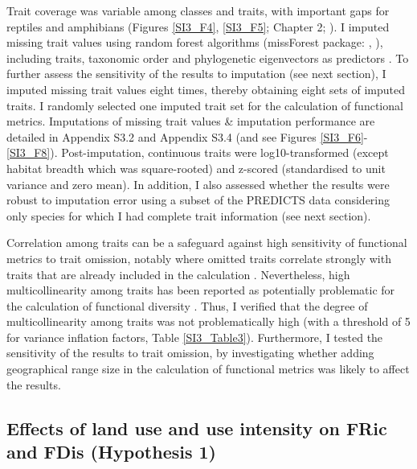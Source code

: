 Trait coverage was variable among classes and traits, with important gaps for reptiles and amphibians (Figures \ref{SI3_F4}, \ref{SI3_F5}; Chapter 2; \citet{Etard2020}). I imputed missing trait values using random forest algorithms (missForest package: \citet{Stekhoven2012}, \citet{Stekhoven2016}), including traits, taxonomic order and phylogenetic eigenvectors as predictors \citep{Debastiani2021, Penone2014}. To further assess the sensitivity of the results to imputation (see next section), I imputed missing trait values eight times, thereby obtaining eight sets of imputed traits. I randomly selected one imputed trait set for the calculation of functional metrics. Imputations of missing trait values \& imputation performance are detailed in Appendix S3.2 and Appendix S3.4 (and see Figures \ref{SI3_F6}-\ref{SI3_F8}). Post-imputation, continuous traits were log10-transformed (except habitat breadth which was square-rooted) and z-scored (standardised to unit variance and zero mean). In addition, I also assessed whether the results were robust to imputation error using a subset of the PREDICTS data considering only species for which I had complete trait information (see next section).

Correlation among traits can be a safeguard against high sensitivity of functional metrics to trait omission, notably where omitted traits correlate strongly with traits that are already included in the calculation \citep{Mouillot2021}. Nevertheless, high multicollinearity among traits has been reported as potentially problematic for the calculation of functional diversity \citep{Cadotte2011}. Thus, I verified that the degree of multicollinearity among traits was not problematically high (with a threshold of 5 for variance inflation factors, Table \ref{SI3_Table3}). Furthermore, I tested the sensitivity of the results to trait omission, by investigating whether adding geographical range size in the calculation of functional metrics was likely to affect the results.


\subsection{Effects of land use and use intensity on FRic and FDis (Hypothesis 1)}

